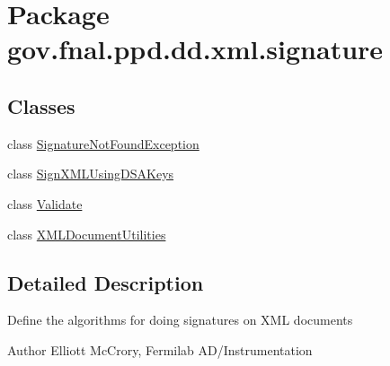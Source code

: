 \hypertarget{namespacegov_1_1fnal_1_1ppd_1_1dd_1_1xml_1_1signature}{\section{Package gov.\-fnal.\-ppd.\-dd.\-xml.\-signature}
\label{namespacegov_1_1fnal_1_1ppd_1_1dd_1_1xml_1_1signature}
}
\subsection*{Classes}
\begin{DoxyCompactItemize}
\item 
class \hyperlink{classgov_1_1fnal_1_1ppd_1_1dd_1_1xml_1_1signature_1_1SignatureNotFoundException}{Signature\-Not\-Found\-Exception}
\item 
class \hyperlink{classgov_1_1fnal_1_1ppd_1_1dd_1_1xml_1_1signature_1_1SignXMLUsingDSAKeys}{Sign\-X\-M\-L\-Using\-D\-S\-A\-Keys}
\item 
class \hyperlink{classgov_1_1fnal_1_1ppd_1_1dd_1_1xml_1_1signature_1_1Validate}{Validate}
\item 
class \hyperlink{classgov_1_1fnal_1_1ppd_1_1dd_1_1xml_1_1signature_1_1XMLDocumentUtilities}{X\-M\-L\-Document\-Utilities}
\end{DoxyCompactItemize}


\subsection{Detailed Description}
Define the algorithms for doing signatures on X\-M\-L documents

\begin{DoxyAuthor}{Author}
Elliott Mc\-Crory, Fermilab A\-D/\-Instrumentation 
\end{DoxyAuthor}
